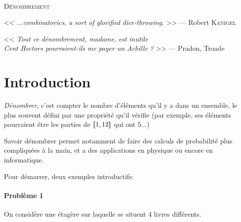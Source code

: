 \documentclass[11pt]{article}
\DeclarePairedDelimiter{\zint}{[\![}{]\!]}
\theoremstyle{definition}
\theoremstyle{remark}
\begin{document}
\begin{center}
	\hrulefill\\
    \vspace{6mm}
	\textsc{\LARGE Dénombrement}\\
    \vspace{3mm}
    \hrulefill
\end{center}
\vspace{1cm}

\begin{flushright}
<< \textit{...combinatorics, a sort of glorified dice-throwing.} >> \hfill— Robert \textsc{Kanigel}
\end{flushright}

\begin{flushright}
<< \textit{Tout ce dénombrement, madame, est inutile\\
Cent Hectors pourraient-ils me payer un Achille ?} >> \hfill — Pradon, Troade
\end{flushright}


\tableofcontents

\section{Introduction}

\textit{Dénombrer}, c'est compter le nombre d'éléments qu'il y a dans un ensemble, le plus souvent défini par une propriété qu'il vérifie (par exemple, ses éléments pourraient être les parties de $\zint{1,12}$  qui ont $5$...)

Savoir dénombrer permet notamment de faire des calculs de probabilité plus compliquées à la main, et a des applications en physique ou encore en informatique.

Pour démarrer, deux exemples introductifs:

\paragraph{Problème 1} On considère une étagère sur laquelle se situent 4 livres différents.

\begin{figure}[h]
\centering
{}
\end{figure}
\end{document}
